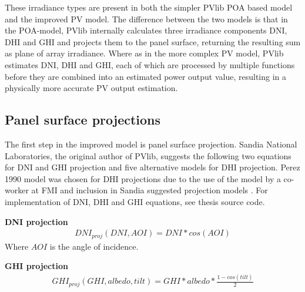 \noindent
These irradiance types are present in both the simpler PVlib POA based model and the improved PV model. The difference between the two models is that in the POA-model, PVlib internally calculates three irradiance components DNI, DHI and GHI and projects them to the panel surface, returning the resulting sum as plane of array irradiance. Where as in the more complex PV model, PVlib estimates DNI, DHI and GHI, each of which are processed by multiple functions before they are combined into an estimated power output value, resulting in a physically more accurate PV output estimation.

\subsection{Panel surface projections}

The first step in the improved model is panel surface projection. Sandia National Laboratories, the original author of PVlib, suggests the following two equations for DNI and GHI projection and five alternative models for DHI projection. Perez 1990 model \cite{perez} was chosen for DHI projections due to the use of the model by a co-worker at FMI and inclusion in Sandia suggested projection models \cite{sandia_poa_dhi}. For implementation of DNI, DHI and GHI equations, see thesis source code.



\noindent\textbf{DNI projection}\cite{sandia_poa_dni}
%
\begin{equation}
\begin{split}
\label{sandia_eq_dni}
DNI_{proj}(DNI, AOI)= DNI*cos(AOI)
\end{split}
\end{equation}
Where $AOI$ is the angle of incidence.


\noindent\textbf{GHI projection}\cite{sandia_poa_ghi}
%
\begin{equation}
\begin{split}
\label{sandia_eq_ghi}
GHI_{proj}(GHI, albedo, tilt)= GHI*albedo*\frac{1-cos(tilt)}{2}
\end{split}
\end{equation}

